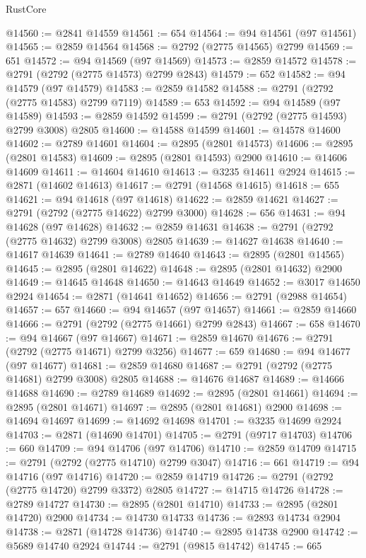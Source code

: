 \begin{lexlean}{RustCore}
\begin{coremodule}
@14560 := @2841 @14559
@14561 := 654
@14564 := @94 @14561 (@97 @14561)
@14565 := @2859 @14564
@14568 := @2792 (@2775 @14565) @2799
@14569 := 651
@14572 := @94 @14569 (@97 @14569)
@14573 := @2859 @14572
@14578 := @2791 (@2792 (@2775 @14573) @2799 @2843)
@14579 := 652
@14582 := @94 @14579 (@97 @14579)
@14583 := @2859 @14582
@14588 := @2791 (@2792 (@2775 @14583) @2799 @7119)
@14589 := 653
@14592 := @94 @14589 (@97 @14589)
@14593 := @2859 @14592
@14599 := @2791 (@2792 (@2775 @14593) @2799 @3008) @2805
@14600 := @14588 @14599
@14601 := @14578 @14600
@14602 := @2789 @14601
@14604 := @2895 (@2801 @14573)
@14606 := @2895 (@2801 @14583)
@14609 := @2895 (@2801 @14593) @2900
@14610 := @14606 @14609
@14611 := @14604 @14610
@14613 := @3235 @14611 @2924
@14615 := @2871 (@14602 @14613)
@14617 := @2791 (@14568 @14615)
@14618 := 655
@14621 := @94 @14618 (@97 @14618)
@14622 := @2859 @14621
@14627 := @2791 (@2792 (@2775 @14622) @2799 @3000)
@14628 := 656
@14631 := @94 @14628 (@97 @14628)
@14632 := @2859 @14631
@14638 := @2791 (@2792 (@2775 @14632) @2799 @3008) @2805
@14639 := @14627 @14638
@14640 := @14617 @14639
@14641 := @2789 @14640
@14643 := @2895 (@2801 @14565)
@14645 := @2895 (@2801 @14622)
@14648 := @2895 (@2801 @14632) @2900
@14649 := @14645 @14648
@14650 := @14643 @14649
@14652 := @3017 @14650 @2924
@14654 := @2871 (@14641 @14652)
@14656 := @2791 (@2988 @14654)
@14657 := 657
@14660 := @94 @14657 (@97 @14657)
@14661 := @2859 @14660
@14666 := @2791 (@2792 (@2775 @14661) @2799 @2843)
@14667 := 658
@14670 := @94 @14667 (@97 @14667)
@14671 := @2859 @14670
@14676 := @2791 (@2792 (@2775 @14671) @2799 @3256)
@14677 := 659
@14680 := @94 @14677 (@97 @14677)
@14681 := @2859 @14680
@14687 := @2791 (@2792 (@2775 @14681) @2799 @3008) @2805
@14688 := @14676 @14687
@14689 := @14666 @14688
@14690 := @2789 @14689
@14692 := @2895 (@2801 @14661)
@14694 := @2895 (@2801 @14671)
@14697 := @2895 (@2801 @14681) @2900
@14698 := @14694 @14697
@14699 := @14692 @14698
@14701 := @3235 @14699 @2924
@14703 := @2871 (@14690 @14701)
@14705 := @2791 (@9717 @14703)
@14706 := 660
@14709 := @94 @14706 (@97 @14706)
@14710 := @2859 @14709
@14715 := @2791 (@2792 (@2775 @14710) @2799 @3047)
@14716 := 661
@14719 := @94 @14716 (@97 @14716)
@14720 := @2859 @14719
@14726 := @2791 (@2792 (@2775 @14720) @2799 @3372) @2805
@14727 := @14715 @14726
@14728 := @2789 @14727
@14730 := @2895 (@2801 @14710)
@14733 := @2895 (@2801 @14720) @2900
@14734 := @14730 @14733
@14736 := @2893 @14734 @2904
@14738 := @2871 (@14728 @14736)
@14740 := @2895 @14738 @2900
@14742 := @5689 @14740 @2924
@14744 := @2791 (@9815 @14742)
@14745 := 665

\end{coremodule}
\end{lexlean}
